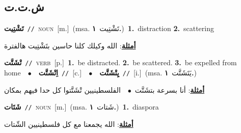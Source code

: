 \documentclass[10pt,a4paper,twoside]{article} %
\begin{document}
\begin{multicols}{2}
\vspace{-3mm}
\subsection*{\color{blue}\foreignlanguage{arabic}{ش.ت.ت}\color{blue}{}} 

{\setlength\topsep{0pt}\textbf{\foreignlanguage{arabic}{تَشْتِيت}}\ {\color{gray}\texttt{//}\color{black}}\ \textsc{noun}\ [m.]\ \color{gray}(msa. \foreignlanguage{arabic}{تَشْتِيت}~\foreignlanguage{arabic}{\textbf{١.}})\color{black}\ \textbf{1.}~distraction  \textbf{2.}~scattering\  \begin{flushright}\color{gray}\foreignlanguage{arabic}{\textbf{\underline{\foreignlanguage{arabic}{أمثلة}}}: الله وكيلك كلنا حاسين بتَشْتِيت هالفترة}\end{flushright}\color{black}} \vspace{2mm}

{\setlength\topsep{0pt}\textbf{\foreignlanguage{arabic}{تْشَتَّت}}\ {\color{gray}\texttt{//}\color{black}}\ \textsc{verb}\ [p.]\ \textbf{1.}~be distracted.  \textbf{2.}~be scattered.  \textbf{3.}~be expelled from home\ \ $\bullet$\ \ \setlength\topsep{0pt}\textbf{\foreignlanguage{arabic}{اِتْشَتَّت}}\ {\color{gray}\texttt{//}\color{black}}\ [c.]\ \ $\bullet$\ \ \setlength\topsep{0pt}\textbf{\foreignlanguage{arabic}{يِتْشَتَّت}}\ {\color{gray}\texttt{//}\color{black}}\ [i.]\ \color{gray}(msa. \foreignlanguage{arabic}{يَتَشَتَّت}~\foreignlanguage{arabic}{\textbf{١.}})\color{black}\  \begin{flushright}\color{gray}\foreignlanguage{arabic}{\textbf{\underline{\foreignlanguage{arabic}{أمثلة}}}: أنا بسرعة بتشَتَّت\ $\bullet$\ \  الفلسطينيين تْشَتَّتوا كل حدا فيهم بمكان}\end{flushright}\color{black}} \vspace{2mm}

{\setlength\topsep{0pt}\textbf{\foreignlanguage{arabic}{شَتَات}}\ {\color{gray}\texttt{//}\color{black}}\ \textsc{noun}\ [m.]\ \color{gray}(msa. \foreignlanguage{arabic}{شَتات}~\foreignlanguage{arabic}{\textbf{١.}})\color{black}\ \textbf{1.}~diaspora\  \begin{flushright}\color{gray}\foreignlanguage{arabic}{\textbf{\underline{\foreignlanguage{arabic}{أمثلة}}}: الله يجمعنا مع كل فلسطينيين الشّتات}\end{flushright}\color{black}} \vspace{2mm}


\end{multicols}
\end{document}
